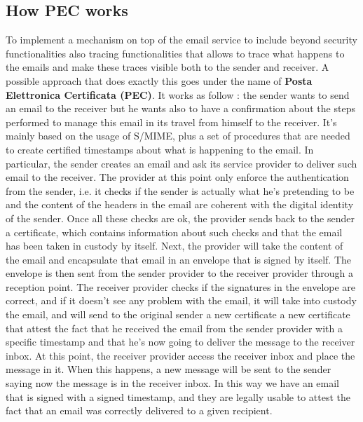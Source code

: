 \subsection{How PEC works}
To implement a mechanism on top of the email service to include beyond security functionalities also tracing functionalities that allows to trace what happens to the emails and make these traces visible both to the sender and receiver. A possible approach that does exactly this goes under the name of \textbf{Posta Elettronica Certificata (PEC)}. It works as follow : the sender wants to send an email to the receiver but he wants also to have a confirmation about the steps performed to manage this email in its travel from himself to the receiver. It's mainly based on the usage of S/MIME, plus a set of procedures that are needed to create certified timestamps about what is happening to the email. In particular, the sender creates an email and ask its service provider to deliver such email to the receiver. The provider at this point only enforce the authentication from the sender, i.e. it checks if the sender is actually what he's pretending to be and the content of the headers in the email are coherent with the digital identity of the sender. Once all these checks are ok, the provider sends back to the sender a certificate, which contains information about such checks and that the email has been taken in custody by itself. Next, the provider will take the content of the email and encapsulate that email in an envelope that is signed by itself. The envelope is then sent from the sender provider to the receiver provider through a reception point. The receiver provider checks if the signatures in the envelope are correct, and if it doesn't see any problem with the email, it will take into custody the email, and will send to the original sender a new certificate a new certificate that attest the fact that he received the email from the sender provider with a specific timestamp and that he's now going to deliver the message to the receiver inbox. At this point, the receiver provider access the receiver inbox and place the message in it. When this happens, a new message will be sent to the sender saying now the message is in the receiver inbox. In this way we have an email that is signed with a signed timestamp, and they are legally usable to attest the fact that an email was correctly delivered to a given recipient.